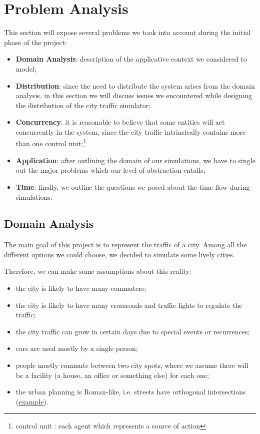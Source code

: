 \section{Problem Analysis}

This section will expose several problems we took into account during the
initial phase of the project:

\begin{itemize}
\item \textbf{Domain Analysis}: description of the applicative context we
  considered to model;
\item \textbf{Distribution}: since the need to distribute the system arises from
  the domain analysis, in this section we will discuss issues we encountered
  while designing the distribution of the city traffic simulator;
\item \textbf{Concurrency}: it is reasonable to believe that some entities
  will act concurrently in the system, since the city traffic intrinsically
  contains more than one control unit;\footnote{control unit : each
  agent which represents a source of action}
\item \textbf{Application}: after outlining the domain of our simulations, we
  have to single out the major problems which our level of abstraction entails;
\item \textbf{Time}: finally, we outline the questions we posed
about the time flow during simulations.
\end{itemize}


\subsection{Domain Analysis}\label{sec:pa-domain}
The main goal of this project is to represent the traffic of a city. Among all the
different options we could choose, we decided to simulate some lively cities.

Therefore, we can make some assumptions about this reality:

\begin{itemize}
\item the city is likely to have many commuters;
\item the city is likely to have many crossroads and traffic lights to
  regulate the traffic;
\item the city traffic can grow in certain days due to special events or
  recurrences;
\item cars are used mostly by a single person;
\item people mostly commute between two city spots, where we assume there
  will be a facility (a house, an office or something else) for each one;
\item the urban planning is Roman-like, i.e. streets have orthogonal
  intersections (\href{https://www.google.it/maps/place/San+Francisco,+California,+Stati+Uniti/@37.7766566,-122.4330836,16z/data=!4m2!3m1!1s0x80859a6d00690021:0x4a501367f076adff}{example}).
\end{itemize}

